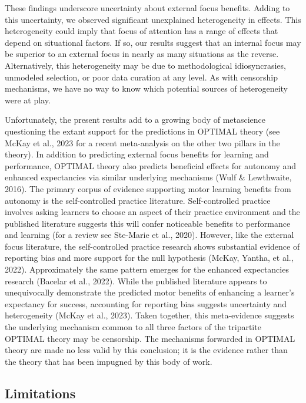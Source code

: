 \documentclass[
  man, donotrepeattitle,floatsintext]{apa7}
\begin{document}
These findings underscore uncertainty about external focus benefits. Adding to this uncertainty, we observed significant unexplained heterogeneity in effects. This heterogeneity could imply that focus of attention has a range of effects that depend on situational factors. If so, our results suggest that an internal focus may be superior to an external focus in nearly as many situations as the reverse. Alternatively, this heterogeneity may be due to methodological idiosyncrasies, unmodeled selection, or poor data curation at any level. As with censorship mechanisms, we have no way to know which potential sources of heterogeneity were at play.

Unfortunately, the present results add to a growing body of metascience questioning the extant support for the predictions in OPTIMAL theory (see McKay et al., 2023 for a recent meta-analysis on the other two pillars in the theory). In addition to predicting external focus benefits for learning and performance, OPTIMAL theory also predicts beneficial effects for autonomy and enhanced expectancies via similar underlying mechanisms (Wulf \& Lewthwaite, 2016). The primary corpus of evidence supporting motor learning benefits from autonomy is the self-controlled practice literature. Self-controlled practice involves asking learners to choose an aspect of their practice environment and the published literature suggests this will confer noticeable benefits to performance and learning (for a review see Ste-Marie et al., 2020). However, like the external focus literature, the self-controlled practice research shows substantial evidence of reporting bias and more support for the null hypothesis (McKay, Yantha, et al., 2022). Approximately the same pattern emerges for the enhanced expectancies research (Bacelar et al., 2022). While the published literature appears to unequivocally demonstrate the predicted motor benefits of enhancing a learner's expectancy for success, accounting for reporting bias suggests uncertainty and heterogeneity (McKay et al., 2023). Taken together, this meta-evidence suggests the underlying mechanism common to all three factors of the tripartite OPTIMAL theory may be censorship. The mechanisms forwarded in OPTIMAL theory are made no less valid by this conclusion; it is the evidence rather than the theory that has been impugned by this body of work.

\hypertarget{limitations}{%
\subsection{Limitations}\label{limitations}}
\end{document}
